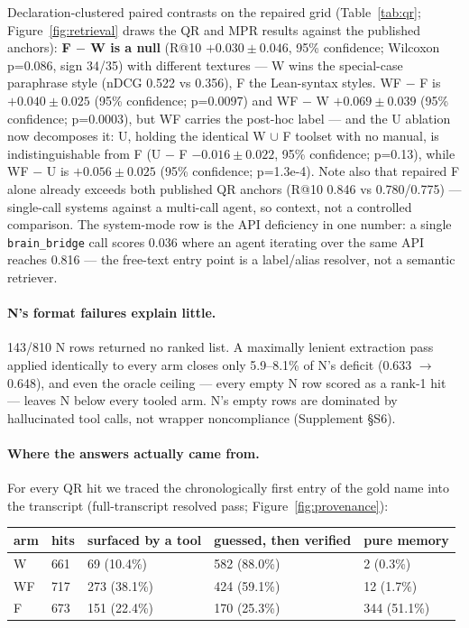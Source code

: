 \documentclass[10pt]{article}
\newcommand{\code}[1]{\texttt{#1}}
\newcommand{\Ssec}[1]{Supplement \S #1}
\begin{document}
Declaration-clustered paired contrasts on the repaired grid
(Table~\ref{tab:qr}; Figure~\ref{fig:retrieval} draws the QR and MPR
results against the published anchors):
\textbf{F $-$ W is a null} (R@10 $+0.030 \pm 0.046$, 95\%
confidence; Wilcoxon p=0.086, sign 34/35) with different textures ---
W wins the special-case paraphrase style (nDCG 0.522 vs 0.356), F the
Lean-syntax styles. WF $-$ F is $+0.040 \pm 0.025$ (95\% confidence;
p=0.0097) and WF $-$ W $+0.069 \pm 0.039$ (95\% confidence;
p=0.0003), but WF carries the post-hoc label --- and the U ablation
now decomposes it: U, holding the identical W $\cup$ F toolset with
no manual, is indistinguishable from F (U $-$ F $-0.016 \pm 0.022$,
95\% confidence; p=0.13), while WF $-$ U is $+0.056 \pm 0.025$
(95\% confidence; p=1.3e-4). Note also that repaired F alone already
exceeds both published QR anchors (R@10 0.846 vs 0.780/0.775) ---
single-call systems against a multi-call agent, so context, not a
controlled comparison. The system-mode row is the API deficiency in one
number: a single \code{brain\_bridge} call scores 0.036 where an agent
iterating over the same API reaches 0.816 --- the free-text entry point
is a label/alias resolver, not a semantic retriever.

\paragraph{N's format failures explain little.} 143/810 N rows returned
no ranked list. A maximally lenient extraction pass applied identically
to every arm closes only 5.9--8.1\% of N's deficit (0.633 $\to$ 0.648),
and even the oracle ceiling --- every empty N row scored as a rank-1
hit --- leaves N below every tooled arm. N's empty rows are dominated by
hallucinated tool calls, not wrapper noncompliance (\Ssec{S6}).

\paragraph{Where the answers actually came from.} For every QR hit we
traced the chronologically first entry of the gold name into the
transcript (full-transcript resolved pass; Figure~\ref{fig:provenance}):

\begin{center}\footnotesize
\begin{tabular}{@{}lllll@{}}
\toprule
arm & hits & surfaced by a tool & guessed, then verified & pure memory \\
\midrule
W & 661 & 69 (10.4\%) & 582 (88.0\%) & 2 (0.3\%) \\
WF & 717 & 273 (38.1\%) & 424 (59.1\%) & 12 (1.7\%) \\
F & 673 & 151 (22.4\%) & 170 (25.3\%) & 344 (51.1\%) \\
\bottomrule
\end{tabular}
\end{center}
\end{document}
